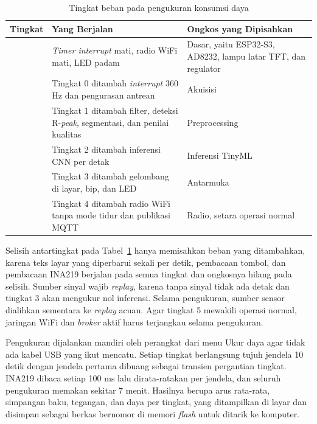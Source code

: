 \begin{table}[!ht]
  \centering
  \caption{Tingkat beban pada pengukuran konsumsi daya}
  \label{tab:tangga-daya}
  \setlength{\tabcolsep}{4pt}
  \renewcommand{\arraystretch}{1.15}
  \small
  \begin{tabular}{>{\centering\arraybackslash}p{1.6cm}>{\RaggedRight\arraybackslash}p{6.4cm}>{\RaggedRight\arraybackslash}p{4.4cm}}
    \toprule
    \textbf{Tingkat} & \textbf{Yang Berjalan} & \textbf{Ongkos yang Dipisahkan} \\
    \midrule
    0 & \textit{Timer interrupt} mati, radio WiFi mati, LED padam & Dasar, yaitu ESP32-S3, AD8232, lampu latar TFT, dan regulator \\
    1 & Tingkat 0 ditambah \textit{interrupt} 360 Hz dan pengurasan antrean & Akuisisi \\
    2 & Tingkat 1 ditambah filter, deteksi R-\textit{peak}, segmentasi, dan penilai kualitas & Preprocessing \\
    3 & Tingkat 2 ditambah inferensi CNN per detak & Inferensi TinyML \\
    4 & Tingkat 3 ditambah gelombang di layar, bip, dan LED & Antarmuka \\
    5 & Tingkat 4 ditambah radio WiFi tanpa mode tidur dan publikasi MQTT & Radio, setara operasi normal \\
    \bottomrule
  \end{tabular}
\end{table}

Selisih antartingkat pada Tabel~\ref{tab:tangga-daya} hanya memisahkan beban yang ditambahkan, karena teks layar yang diperbarui sekali per detik, pembacaan tombol, dan pembacaan INA219 berjalan pada semua tingkat dan ongkosnya hilang pada selisih. Sumber sinyal wajib \textit{replay}, karena tanpa sinyal tidak ada detak dan tingkat 3 akan mengukur nol inferensi. Selama pengukuran, sumber sensor dialihkan sementara ke \textit{replay} acuan. Agar tingkat 5 mewakili operasi normal, jaringan WiFi dan \textit{broker} aktif harus terjangkau selama pengukuran.

Pengukuran dijalankan mandiri oleh perangkat dari menu Ukur daya agar tidak ada kabel USB yang ikut mencatu. Setiap tingkat berlangsung tujuh jendela 10 detik dengan jendela pertama dibuang sebagai transien pergantian tingkat. INA219 dibaca setiap 100 ms lalu dirata-ratakan per jendela, dan seluruh pengukuran memakan sekitar 7 menit. Hasilnya berupa arus rata-rata, simpangan baku, tegangan, dan daya per tingkat, yang ditampilkan di layar dan disimpan sebagai berkas bernomor di memori \textit{flash} untuk ditarik ke komputer.

